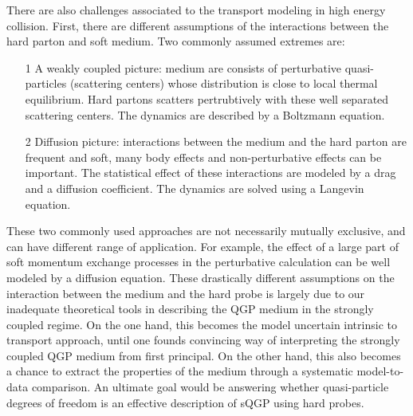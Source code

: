 There are also challenges associated to the transport modeling in high energy collision.
First, there are different assumptions of the interactions between the hard parton and soft medium.
Two commonly assumed extremes are:
\begin{itemize}
\item[1] A weakly coupled picture: medium are consists of perturbative quasi-particles (scattering centers) whose distribution is close to local thermal equilibrium.
Hard partons scatters pertrubtively with these well separated scattering centers. The dynamics are described by a Boltzmann equation.
\item[2] Diffusion picture: interactions between the medium and the hard parton are frequent and soft, many body effects and non-perturbative effects can be important. The statistical effect of these interactions are modeled by a drag and a diffusion coefficient. The dynamics are solved using a Langevin equation.
\end{itemize}
These two commonly used approaches are not necessarily mutually exclusive, and can have different range of application. 
For example, the effect of a large part of soft momentum exchange processes in the perturbative calculation can be well modeled by a diffusion equation.
These drastically different assumptions on the interaction between the medium and the hard probe is largely due to our inadequate theoretical tools in describing the QGP medium in the strongly coupled regime.
On the one hand, this becomes the model uncertain intrinsic to transport approach, until one founds convincing way of interpreting the strongly coupled QGP medium from first principal.
On the other hand, this also becomes a chance to extract the properties of the medium through a systematic model-to-data comparison. 
An ultimate goal would be answering whether quasi-particle degrees of freedom is an effective description of sQGP using hard probes.

